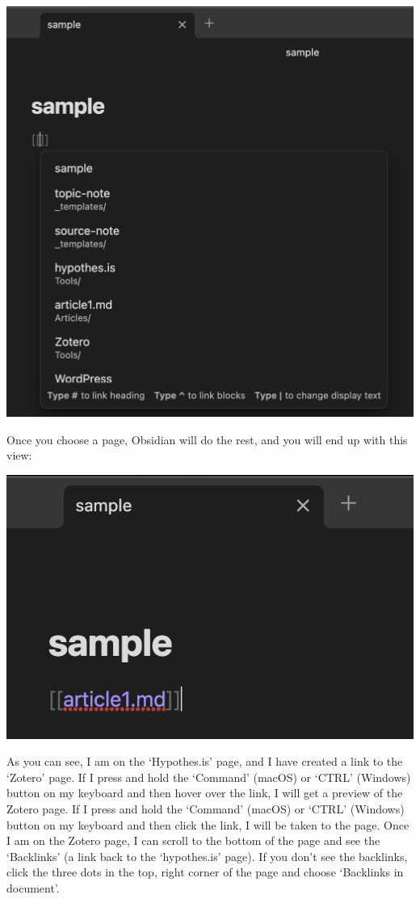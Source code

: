 \documentclass[
]{book}
\theoremstyle{definition}
\theoremstyle{definition}
\theoremstyle{definition}
\theoremstyle{definition}
\theoremstyle{remark}
\begin{document}
\includegraphics{assets/u3/wikilink.png}

Once you choose a page, Obsidian will do the rest, and you will end up with this view:

\includegraphics{assets/u3/wikilink2.png}

As you can see, I am on the `Hypothes.is' page, and I have created a link to the `Zotero' page. If I press and hold the `Command' (macOS) or `CTRL' (Windows) button on my keyboard and then hover over the link, I will get a preview of the Zotero page. If I press and hold the `Command' (macOS) or `CTRL' (Windows) button on my keyboard and then click the link, I will be taken to the page. Once I am on the Zotero page, I can scroll to the bottom of the page and see the `Backlinks' (a link back to the `hypothes.is' page). If you don't see the backlinks, click the three dots in the top, right corner of the page and choose `Backlinks in document'.
\end{document}
